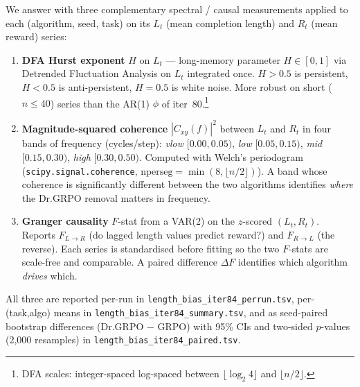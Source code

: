 We answer with three complementary spectral / causal measurements applied to
each (algorithm, seed, task) on its $L_t$ (mean completion length) and
$R_t$ (mean reward) series:
\begin{enumerate}\item \textbf{DFA Hurst exponent} $H$ on $L_t$ --- long-memory
parameter $H\in[0,1]$ via Detrended Fluctuation Analysis on $L_t$ integrated
once.  $H>0.5$ is persistent, $H<0.5$ is anti-persistent, $H=0.5$ is white
noise. More robust on short ($n\!\le\!40$) series than the AR(1)
$\phi$ of iter~80.\footnote{DFA scales: integer-spaced log-spaced between
$\lfloor\log_2 4\rfloor$ and $\lfloor n/2\rfloor$.}\label{it:dfa}
\item \textbf{Magnitude-squared coherence} $|C_{xy}(f)|^2$ between $L_t$ and
$R_t$ in four bands of frequency (cycles/step):
\emph{vlow} $[0.00,0.05)$, \emph{low} $[0.05,0.15)$, \emph{mid} $[0.15,0.30)$,
\emph{high} $[0.30,0.50)$. Computed with Welch's periodogram
(\texttt{scipy.signal.coherence}, $\mathrm{nperseg}=\min(8,\lfloor n/2\rfloor)$).
A band whose coherence is significantly different between the two
algorithms identifies \emph{where} the Dr.GRPO removal matters in
frequency. \label{it:coh}
\item \textbf{Granger causality} $F$-stat from a VAR(2) on the
$z$-scored $(L_t,R_t)$. Reports $F_{L\to R}$ (do lagged length values
predict reward?) and $F_{R\to L}$ (the reverse). Each series is
standardised before fitting so the two $F$-stats are scale-free and
comparable. A paired difference $\Delta F$ identifies which algorithm
\emph{drives} which. \label{it:grg}
\end{enumerate}

All three are reported per-run in
\texttt{length\_bias\_iter84\_perrun.tsv}, per-(task,algo) means in
\texttt{length\_bias\_iter84\_summary.tsv}, and as seed-paired bootstrap
differences (Dr.GRPO $-$ GRPO) with 95\% CIs and two-sided $p$-values
(2{,}000 resamples) in \texttt{length\_bias\_iter84\_paired.tsv}.

